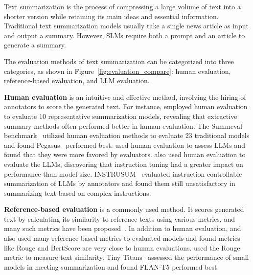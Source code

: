 
Text summarization is the process of compressing a large volume of text into a shorter version while retaining its main ideas and essential information. Traditional text summarization models usually take a single news article as input and output a summary. However, SLMs require both a prompt and an article to generate a summary. 



The evaluation methods of text summarization can be categorized into three categories, as shown in Figure~\ref{fig:evaluation_compare}: human evaluation, reference-based evaluation, and LLM evaluation. 


\noindent \textbf{Human evaluation} is an intuitive and effective method, involving the hiring of annotators to score the generated text. For instance, \citet{huang-etal-2020-achieved} employed human evaluation to evaluate 10 representative summarization models, revealing that extractive summary methods often performed better in human evaluation. The Summeval benchmark~\cite{fabbri2021summeval} utilized human evaluation methods to evaluate 23 traditional models and found Pegasus~\cite{pegasus} performed best. \citet{dead_summarization} used human evaluation to assess LLMs and found that they were more favored by evaluators. \citet{zhang2024benchmarking} also used human evaluation to evaluate the LLMs, discovering that instruction tuning had a greater impact on performance than model size. INSTRUSUM~\cite{liu2023benchmarking} evaluated instruction controllable summarization of LLMs by annotators and found them still unsatisfactory in summarizing text based on complex instructions.


\noindent \textbf{Reference-based evaluation} is a commonly used method. It scores generated text by calculating its similarity to reference texts using various metrics, and many such metrics have been proposed~\cite{lin-2004-rouge,papineni-etal-2002-bleu,sellam-etal-2020-bleurt,bert-score,bartscore}. In addition to human evaluation, \citet{huang-etal-2020-achieved} and ~\citet{fabbri2021summeval} also used many reference-based metrics to evaluated models and found metrics like Rouge and BertScore are very close to human evaluations. \citet{google-2023-benchmarking} used the Rouge metric to measure text similarity. Tiny Titans~\cite{tiny_titan} assessed the performance of small models in meeting summarization and found FLAN-T5 performed best.


